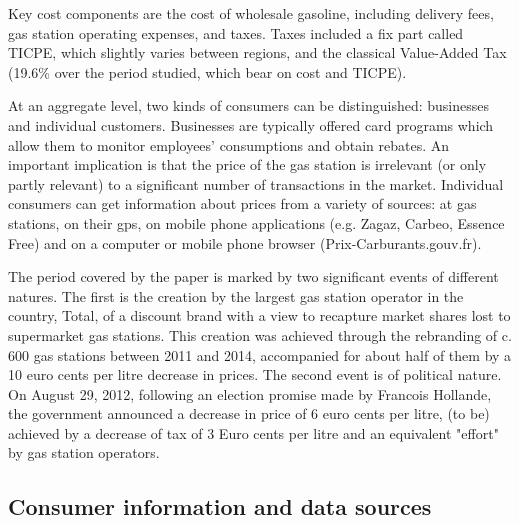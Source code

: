 \documentclass[english]{article}
\begin{document}
Key cost components are the cost of wholesale gasoline, including delivery fees,  gas station operating expenses, and taxes. Taxes included a fix part called TICPE, which slightly varies between regions, and the classical Value-Added Tax (19.6\% over the period studied, which bear on cost and TICPE).

At an aggregate level, two kinds of consumers can be distinguished: businesses and individual customers. Businesses are typically offered card programs which allow them to monitor employees' consumptions and obtain rebates. An important implication is that the price of the gas station is irrelevant (or only partly relevant) to a significant number of transactions in the market. Individual consumers can get information about prices from a variety of sources: at gas stations, on their gps, on mobile phone applications (e.g. Zagaz, Carbeo, Essence Free) and on a computer or mobile phone browser (Prix-Carburants.gouv.fr).

The period covered by the paper is marked by two significant events of different natures. The first is the creation by the largest gas station operator in the country, Total, of a discount brand with a view to recapture market shares lost to supermarket gas stations. This creation was achieved through the rebranding of c. 600 gas stations between 2011 and 2014, accompanied for about half of them by a 10 euro cents per litre decrease in prices. The second event is of political nature. On August 29, 2012, following an election promise made by Francois Hollande, the government announced a decrease in price of 6 euro cents per litre, (to be) achieved by a decrease of tax of 3 Euro cents per litre and an equivalent "effort" by gas station operators.

\subsection{Consumer information and data sources}
\end{document}
